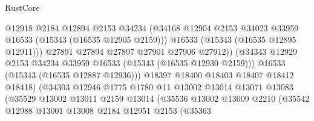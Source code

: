 \begin{lexlean}{RustCore}
\begin{coremodule}
                                      @12918
                                      @2184
                                      @12894
                                      @2153
                                      @34234
                                      (@34168
                                        @12904
                                        @2153
                                        @34023
                                        @33959
                                        @16533
                                        (@15343 (@16535 @12905 @2159)))
                                      @16533
                                      (@15343 (@16535 @12895 @12911)))
                                    @27891
                                    @27894
                                    @27897
                                    @27901
                                    @27906
                                    @27912))
                                (@34343
                                  @12929
                                  @2153
                                  @34234
                                  @33959
                                  @16533
                                  (@15343 (@16535 @12930 @2159)))
                                @16533
                                (@15343 (@16535 @12887 @12936)))
                              @18397
                              @18400
                              @18403
                              @18407
                              @18412
                              @18418)
                            (@34303
                              @12946
                              @1775
                              @1780
                              @11
                              @13002
                              @13014
                              @13071
                              @13083
                              (@35529
                                @13002
                                @13011
                                @2159
                                @13014
                                (@35536
                                  @13002
                                  @13009
                                  @2210
                                  (@35542
                                    @12988
                                    @13001
                                    @13008
                                    @2184
                                    @12951
                                    @2153
                                    (@35363

\end{coremodule}
\end{lexlean}
